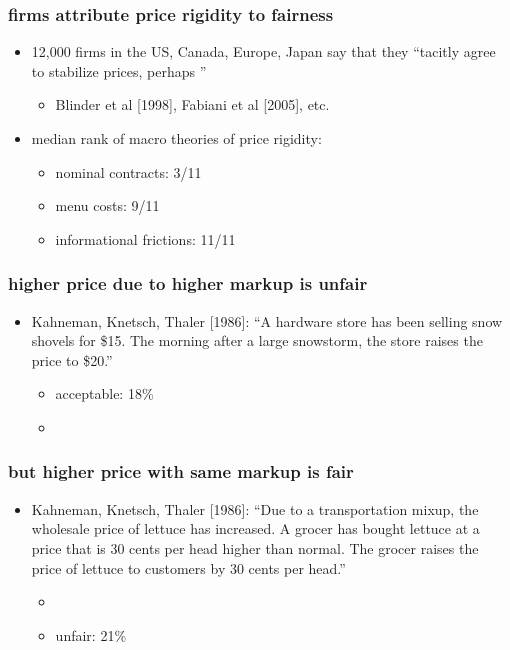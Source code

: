 \documentclass[12pt,xcolor={dvipsnames},hyperref={pdftex,pdfpagemode=UseNone,hidelinks,pdfdisplaydoctitle=true},usepdftitle=false]{beamer}
\begin{document}
\begin{frame}
\end{frame}

\begin{frame}
\frametitle{firms attribute price rigidity to fairness}
\begin{itemize}
\item 12,000 firms in the US, Canada, Europe, Japan say that they ``tacitly agree to stabilize prices, perhaps ''
\begin{itemize}
\item Blinder et al [1998], Fabiani et al [2005], etc.
\end{itemize}
\item median rank of macro theories of price rigidity:
\begin{itemize}
	\item nominal contracts: 3/11
	\item menu costs: 9/11
	\item informational frictions: 11/11
\end{itemize}
\end{itemize}
\end{frame}

\begin{frame}
\frametitle{higher price due to higher markup is unfair}
\begin{itemize}
\item Kahneman, Knetsch, Thaler [1986]: ``A hardware store has been selling snow shovels for \$15. The morning after a large snowstorm, the store raises the price to \$20.''
\begin{itemize}
\item acceptable: 18\% 
\item {}
\end{itemize}
\end{itemize}
\end{frame}

\begin{frame}
\frametitle{but higher price with same markup is fair} 
\begin{itemize}
\item Kahneman, Knetsch, Thaler [1986]: ``Due to a transportation mixup, the wholesale price of lettuce has increased. A grocer has bought lettuce at a price that is 30 cents per head higher than normal. The grocer raises the price of lettuce to customers by 30 cents per head.''
\begin{itemize}
\item {}
\item unfair: 21\%
\end{itemize}
\end{itemize}
\end{frame}
\end{document}
